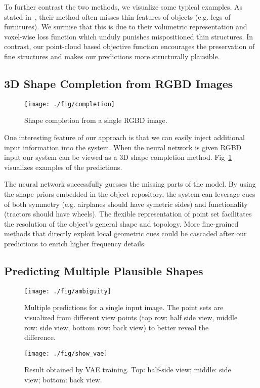 \documentclass[10pt,twocolumn,letterpaper]{article}
\begin{document}
To further contrast the two methods, we visualize some typical examples. As stated in~\cite{choy20163d}, their method often misses thin features of objects (e.g. legs of furnitures). We surmise that this is due to their volumetric representation and voxel-wise loss function which unduly punishes mispositioned thin structures. In contrast, our point-cloud based objective function encourages the preservation of fine structures and makes our predictions more structurally plausible.

\subsection{3D Shape Completion from RGBD Images}\label{sec:exp:depth}\begin{figure}[th!]
  \centering
  \texttt{[image: ./fig/completion]}
  \caption{Shape completion from a single RGBD image.}\label{fig:shape_completion}
\end{figure}
One interesting feature of our approach is that we can easily inject additional input information into the system. When the neural network is given RGBD input our system can be viewed as a 3D shape completion method. Fig~\ref{fig:shape_completion} visualizes examples of the predictions.

The neural network successfully guesses the missing parts of the model. By using the shape priors embedded in the object repository, the system can leverage cues of both symmetry (e.g. airplanes should have symetric sides) and functionality (tractors should have wheels). The flexible representation of point set facilitates the resolution of the object's general shape and topology. More fine-grained methods that directly exploit local geometric cues could be cascaded after our predictions to enrich higher frequency details.

\subsection{Predicting Multiple Plausible Shapes}\label{sec:exp:gan}\begin{figure}[t!]
  \centering
  \texttt{[image: ./fig/ambiguity]}
  \caption{Multiple predictions for a single input image. The point sets are visualized from different view points (top row: half side view, middle row: side view, bottom row: back view) to better reveal the difference.}\label{fig:deformation}
\end{figure}\begin{figure}
\centering
\texttt{[image: ./fig/show\_vae]}
\caption{Result obtained by VAE training. Top: half-side view; middle: side view; bottom: back view.}
\label{fig:show_vae}
\end{figure}
\end{document}
